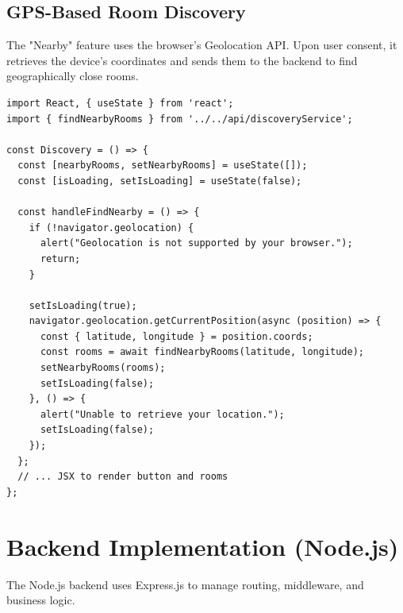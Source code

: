 \FloatBarrier
\subsection{GPS-Based Room Discovery}
The "Nearby" feature uses the browser's Geolocation API. Upon user consent, it retrieves the device's coordinates and sends them to the backend to find geographically close rooms.
\FloatBarrier
\begin{lstlisting}[language=JSX, caption={Logic for finding nearby rooms using the Geolocation API.}]
import React, { useState } from 'react';
import { findNearbyRooms } from '../../api/discoveryService';

const Discovery = () => {
  const [nearbyRooms, setNearbyRooms] = useState([]);
  const [isLoading, setIsLoading] = useState(false);

  const handleFindNearby = () => {
    if (!navigator.geolocation) {
      alert("Geolocation is not supported by your browser.");
      return;
    }
    
    setIsLoading(true);
    navigator.geolocation.getCurrentPosition(async (position) => {
      const { latitude, longitude } = position.coords;
      const rooms = await findNearbyRooms(latitude, longitude);
      setNearbyRooms(rooms);
      setIsLoading(false);
    }, () => {
      alert("Unable to retrieve your location.");
      setIsLoading(false);
    });
  };
  // ... JSX to render button and rooms
};
\end{lstlisting}
\FloatBarrier

\section{Backend Implementation (Node.js)}
\label{sec:impl-backend}
The Node.js backend uses Express.js to manage routing, middleware, and business logic.

